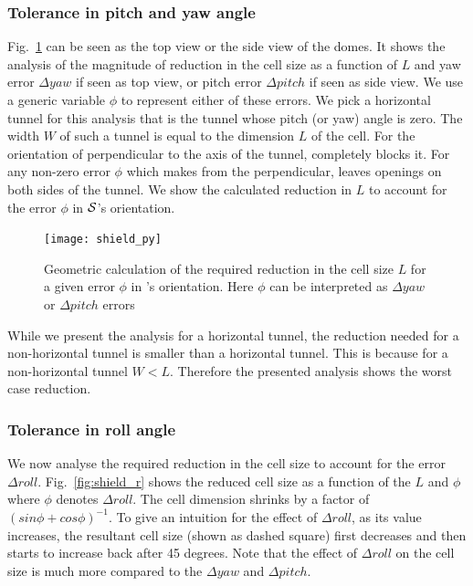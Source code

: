 \documentclass[a4paper]{report}
\begin{document}
\subsubsection{Tolerance in pitch and yaw angle}
Fig.~\ref{fig:shield_py} can be seen as the top view or the side view of the domes. It shows the analysis of the magnitude of reduction in the cell size as a function of $L$ and yaw error $\Delta yaw$ if seen as top view, or pitch error $\Delta pitch$ if seen as side view. We use a generic variable $\phi$ to represent either of these errors.
We pick a horizontal tunnel for this analysis that is the tunnel whose pitch (or yaw) angle is zero.
The width $W$ of such a tunnel is equal to the dimension $L$ of the cell. For the orientation of \calS perpendicular to the axis of the tunnel, \calS completely blocks it. For any non-zero error $\phi$ which \calS makes from the perpendicular, \calS leaves openings on both sides of the tunnel.
We show the calculated reduction in $L$ to account for the error $\phi$ in $\mathcal{S}$'s orientation.

\begin{figure}[ht]
\centering
\texttt{[image: shield\_py]}
\caption{Geometric calculation of the required reduction in the cell size $L$ for a given error $\phi$ in \calS's orientation. Here $\phi$ can be interpreted as $\Delta yaw$ or $\Delta pitch$ errors}
\label{fig:shield_py}
\end{figure}

While we present the analysis for a horizontal tunnel, the reduction needed for a non-horizontal tunnel is smaller than a horizontal tunnel. This is because for a non-horizontal tunnel $W < L$. Therefore the presented analysis shows the worst case reduction.


\subsubsection{Tolerance in roll angle}
We now analyse the required reduction in the cell size to account for the error $\Delta roll$. Fig.~\ref{fig:shield_r} shows the reduced cell size as a function of the $L$ and $\phi$ where $\phi$ denotes $\Delta roll$. The cell dimension shrinks by a factor of $(sin \phi + cos \phi)^{-1}$. To give an intuition for the effect of $\Delta roll$, as its value increases, the resultant cell size (shown as dashed square) first decreases and then starts to increase back after 45 degrees. Note that the effect of $\Delta roll$ on the cell size is much more compared to the $\Delta yaw$ and $\Delta pitch$.
\end{document}
